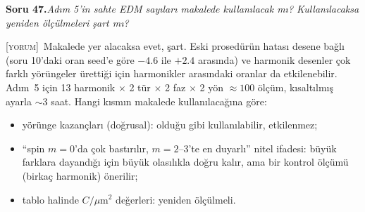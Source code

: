 \documentclass[11pt,a4paper]{article}
\newcommand{\YOR}{\textsc{[yorum]}}
\newcounter{soru}
\newcommand{\soru}[2]{%
  \par\medskip\noindent\textbf{Soru #1.}\enspace\textit{#2}\par\nopagebreak\smallskip}
\begin{document}
\soru{47}{Adım 5'in sahte EDM sayıları makalede kullanılacak mı? Kullanılacaksa yeniden ölçülmeleri şart mı?}

\YOR~Makalede yer alacaksa evet, şart. Eski prosedürün hatası desene bağlı (soru 10'daki oran seed'e göre
$-4.6$ ile $+2.4$ arasında) ve harmonik desenler çok farklı yörüngeler ürettiği için harmonikler arasındaki
oranlar da etkilenebilir. Adım~5 için 13 harmonik $\times$ 2 tür $\times$ 2 faz $\times$ 2 yön
$\approx100$ ölçüm, kısaltılmış ayarla $\sim$3 saat. Hangi kısmın makalede kullanılacağına göre:
\begin{itemize}[nosep]
\item yörünge kazançları (doğrusal): olduğu gibi kullanılabilir, etkilenmez;
\item ``spin $m=0$'da çok bastırılır, $m=2$--3'te en duyarlı'' nitel ifadesi: büyük farklara dayandığı için
büyük olasılıkla doğru kalır, ama bir kontrol ölçümü (birkaç harmonik) önerilir;
\item tablo halinde $C/\mu$m$^2$ değerleri: yeniden ölçülmeli.
\end{itemize}

\end{document}
